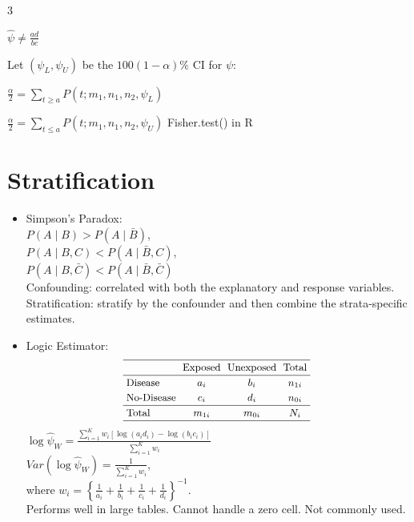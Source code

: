 \documentclass[a4paper,10pt]{article}
\begin{document}
\begin{multicols}{3}
\begin{itemize}
    $
    \hat{\psi} \neq \frac{ad}{bc}$ 
    
    
    Let \((\psi_L, \psi_U)\) be the \( 100(1 - \alpha)\% \) CI for \(\psi\):
    
    $
    \frac{\alpha}{2} = \sum_{t \geq a} P(t; m_1, n_1, n_2, \psi_L)
    $
    
    $
    \frac{\alpha}{2} = \sum_{t \leq a} P(t; m_1, n_1, n_2, \psi_U)
    $
    Fisher.test() in R
 
\end{itemize}

\section*{Stratification}
\begin{itemize}
    \item Simpson's Paradox:\\ $P(A \mid B) > P(A \mid \bar{B})$,\\ $P(A \mid B, C) < P(A \mid \bar{B}, C)$,\\ $P(A \mid B, \bar{C}) < P(A \mid \bar{B}, \bar{C})$\\
    Confounding: correlated with both the explanatory and response variables.\\
    Stratification: stratify by the confounder and then combine the strata-specific estimates.
    \item Logic Estimator:\\
    \[
    \renewcommand{\arraystretch}{1.2}
    \setlength{\tabcolsep}{3pt}
    \text{\small
    \begin{tabular}{lccc}
    \hline
     & \text{Exposed} & \text{Unexposed} & \text{Total} \\ \hline
    \text{Disease} & $a_i$ & $b_i$ & $n_{1i}$ \\
    \text{No-Disease} & $c_i$ & $d_i$ & $n_{0i}$ \\ \hline
    \text{Total} & $m_{1i}$ & $m_{0i}$ & $N_i$ \\
    \hline
    \end{tabular}
    }
    \]
    $\log \hat{\psi}_W = \frac{\sum_{i=1}^K w_i [\log(a_i d_i) - \log(b_i c_i)]}{\sum_{i=1}^K w_i}$\\
    $Var(\log \hat{\psi}_W) = \frac{1}{\sum_{i=1}^K w_i}$,\\ where $
    w_i = \left\{ \frac{1}{a_i} + \frac{1}{b_i} + \frac{1}{c_i} + \frac{1}{d_i} \right\}^{-1}.
    $\\
    Performs well in large tables. Cannot handle a zero cell. Not commonly used.

\end{itemize}
\end{multicols}
\end{document}

